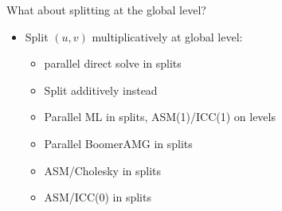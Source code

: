 \begin{frame}{What about splitting at the global level?}
  \begin{itemize}\footnotesize
  \item Split $(u,v)$ multiplicatively at global level: {}
    \begin{itemize} 
    \item parallel direct solve in splits \\
      {}
    \item Split additively instead \\
      {}
    \item Parallel ML in splits, ASM(1)/ICC(1) on levels \\
      {}
    \item Parallel BoomerAMG in splits \\
      {}
    \item ASM/Cholesky in splits \\
      {}
    \item ASM/ICC(0) in splits \\
      {}
    \end{itemize}
  \end{itemize}
\end{frame}

